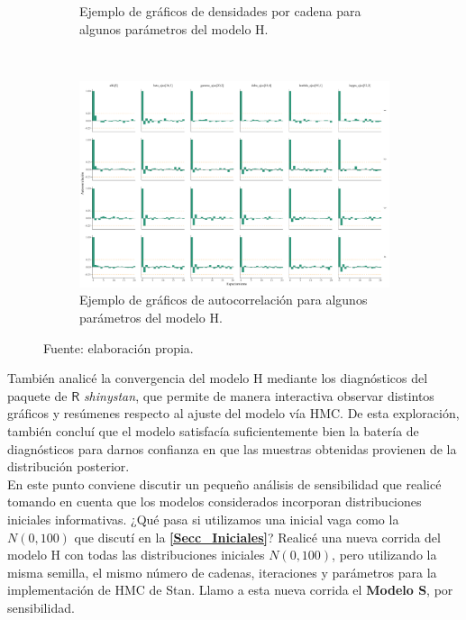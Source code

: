 \begin{figure}[h]
\begin{subfigure}{0.45\textwidth}
	\caption{Ejemplo de gráficos de densidades por cadena para algunos parámetros del modelo H.}
	\label{fig:Densidades_H}
	\end{subfigure}
	~
	\begin{subfigure}{0.6\textwidth}
	\includegraphics[width = \textwidth]{Figs/Convergencia/Convergencia_AutoCorr}
	\caption{Ejemplo de gráficos de autocorrelación para algunos parámetros del modelo H.}
	\label{fig:Autocorr_H}
	\end{subfigure}
	\caption{Fuente: elaboración propia.}
\end{figure}

 También analicé la convergencia del modelo H mediante los diagnósticos del paquete de $\mathsf{R}$ \textit{shinystan}, que permite de manera interactiva observar distintos gráficos y resúmenes respecto al ajuste del modelo vía HMC. De esta exploración, también concluí que el modelo satisfacía suficientemente bien la batería de diagnósticos para darnos confianza en que las muestras obtenidas provienen de la distribución posterior.\\
 
 En este punto conviene discutir un pequeño análisis de sensibilidad que realicé tomando en cuenta que los modelos considerados incorporan distribuciones iniciales informativas. ¿Qué pasa si utilizamos una inicial vaga como la $N(0,100)$ que discutí en la \textbf{\autoref{Secc_Iniciales}}? Realicé una nueva corrida del modelo H con todas las distribuciones iniciales $N(0,100)$, pero utilizando la misma semilla, el mismo número de cadenas, iteraciones y parámetros para la implementación de HMC de Stan. Llamo a esta nueva corrida el \textbf{Modelo S}, por sensibilidad.\\
  
